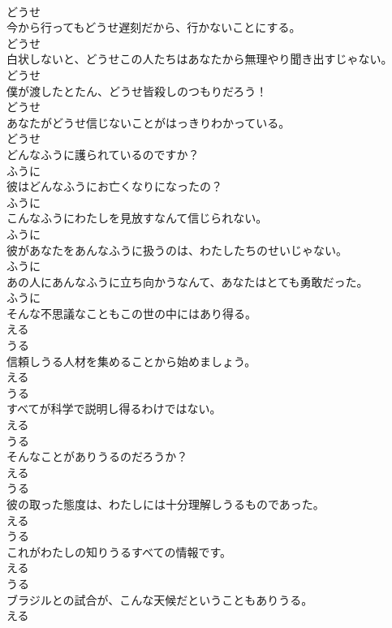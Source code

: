 \documentclass[8pt]{extreport}
\begin{document}
\begin{CJK}{UTF8}{min}
\\	どうせ
\\	今から行ってもどうせ遅刻だから、行かないことにする。	
\\	どうせ
\\	白状しないと、どうせこの人たちはあなたから無理やり聞き出すじゃない。	
\\	どうせ
\\	僕が渡したとたん、どうせ皆殺しのつもりだろう！	
\\	どうせ
\\	あなたがどうせ信じないことがはっきりわかっている。	
\\	どうせ
\\	どんなふうに護られているのですか？	
\\	ふうに
\\	彼はどんなふうにお亡くなりになったの？	
\\	ふうに
\\	こんなふうにわたしを見放すなんて信じられない。	
\\	ふうに
\\	彼があなたをあんなふうに扱うのは、わたしたちのせいじゃない。	
\\	ふうに
\\	あの人にあんなふうに立ち向かうなんて、あなたはとても勇敢だった。	
\\	ふうに
\\	そんな不思議なこともこの世の中にはあり得る。	
\\	える 
\\	うる
\\	信頼しうる人材を集めることから始めましょう。	
\\	える 
\\	うる
\\	すべてが科学で説明し得るわけではない。	
\\	える 
\\	うる
\\	そんなことがありうるのだろうか？	
\\	える 
\\	うる
\\	彼の取った態度は、わたしには十分理解しうるものであった。	
\\	える 
\\	うる
\\	これがわたしの知りうるすべての情報です。	
\\	える 
\\	うる
\\	ブラジルとの試合が、こんな天候だということもありうる。	
\\	える 

\end{CJK}
\end{document}
